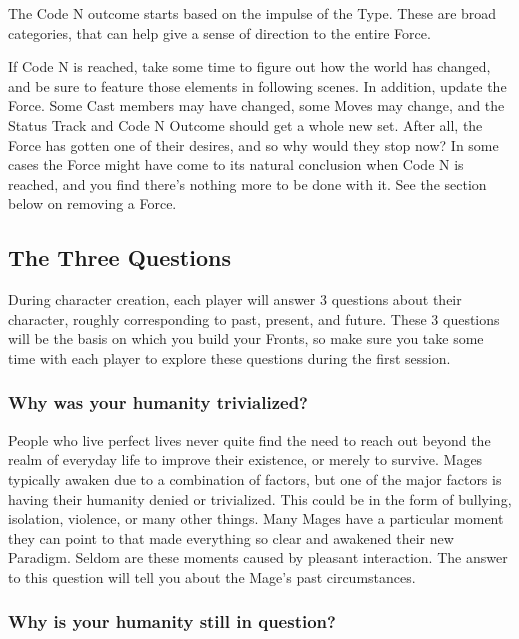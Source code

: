 \documentclass[
]{article}
\begin{document}
The Code N outcome starts based on the impulse of the Type. These are
broad categories, that can help give a sense of direction to the entire
Force.

If Code N is reached, take some time to figure out how the world has
changed, and be sure to feature those elements in following scenes. In
addition, update the Force. Some Cast members may have changed, some
Moves may change, and the Status Track and Code N Outcome should get a
whole new set. After all, the Force has gotten one of their desires, and
so why would they stop now? In some cases the Force might have come to
its natural conclusion when Code N is reached, and you find there's
nothing more to be done with it. See the section below on removing a
Force.

\hypertarget{the-three-questions-1}{%
\subsection{The Three Questions}\label{the-three-questions-1}}

During character creation, each player will answer 3 questions about
their character, roughly corresponding to past, present, and future.
These 3 questions will be the basis on which you build your Fronts, so
make sure you take some time with each player to explore these questions
during the first session.

\hypertarget{why-was-your-humanity-trivialized}{%
\subsubsection{Why was your humanity
trivialized?}\label{why-was-your-humanity-trivialized}}

People who live perfect lives never quite find the need to reach out
beyond the realm of everyday life to improve their existence, or merely
to survive. Mages typically awaken due to a combination of factors, but
one of the major factors is having their humanity denied or trivialized.
This could be in the form of bullying, isolation, violence, or many
other things. Many Mages have a particular moment they can point to that
made everything so clear and awakened their new Paradigm. Seldom are
these moments caused by pleasant interaction. The answer to this
question will tell you about the Mage's past circumstances.

\hypertarget{why-is-your-humanity-still-in-question}{%
\subsubsection{Why is your humanity still in
question?}\label{why-is-your-humanity-still-in-question}}
\end{document}
